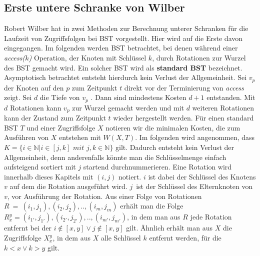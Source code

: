 \documentclass[a4paper,12pt]{article}
\begin{document}
\subsection{Erste untere Schranke von Wilber} \label{wilberBound}
Robert Wilber hat in \cite{wilberLowerBounds} zwei Methoden zur Berechnung unterer Schranken für die Laufzeit von Zugriffsfolgen bei BST vorgestellt. Hier wird auf die Erste davon eingegangen. Im folgenden werden BST betrachtet, bei denen während einer \textit{access($k$)} Operation, der Knoten mit Schlüssel $k$, durch Rotationen zur Wurzel des BST gemacht wird. Ein solcher BST wird als \textbf{standard BST} bezeichnet. Asymptotisch betrachtet entsteht hierdurch kein Verlust der Allgemeinheit. Sei $v_p$ der Knoten auf den $p$ zum Zeitpunkt $t$ direkt vor der Terminierung von \textit{access} zeigt. Sei $d$ die Tiefe von $v_p$ . Dann sind mindestens Kosten $d + 1$ entstanden. Mit $d$ Rotationen kann $v_p$ zur Wurzel gemacht werden und mit $d$ weiteren Rotationen kann der Zustand zum Zeitpunkt $t$ wieder hergestellt werden.
Für einen standard BST $T$ und einer Zugriffsfolge $X$ notieren wir die minimalen Kosten, die zum Ausführen von $X$ entstehen mit $W(X, T)$. Im folgenden wird angenommen, dass 
$K = \{  i \in \mathbb{N} \vert i \in \left[j,k\right] \textit{ mit } j,k \in  \mathbb{N} \} $ gilt. Dadurch entsteht kein Verlust der Allgemeinheit, denn anderenfalls könnte man die Schlüsselmenge einfach aufsteigend sortiert mit $j$ startend durchnummerieren. Eine Rotation wird innerhalb dieses Kapitels mit $\left(i, j\right)$ notiert. $i$ ist dabei der Schlüssel des Knotens $v$ auf dem die Rotation ausgeführt wird. $j$~ist der Schlüssel des Elternknoten von $v$, vor Ausführung der Rotation. Aus einer Folge von Rotationen $R~=~\left(i_1,j_1 \right),\left(i_2,j_2 \right),..,\left(i_m,j_m \right)$ erhält man die Folge  $R^y_x = \left(i_{1'},j_{1'}\right),\left(i_{2'},j_{2'} \right),..,\left(i_{m'},j_{m'} \right)$, in dem man aus $R$ jede Rotation entfernt bei der $i\notin \left[x,y\right] \lor j\notin \left[x,y\right]$ gilt. Ähnlich erhält man aus $X$ die Zugriffsfolge $X^y_x$, in dem aus $X$ alle Schlüssel $k$ entfernt werden, für die $k < x  \lor k > y$ gilt.
\end{document}
